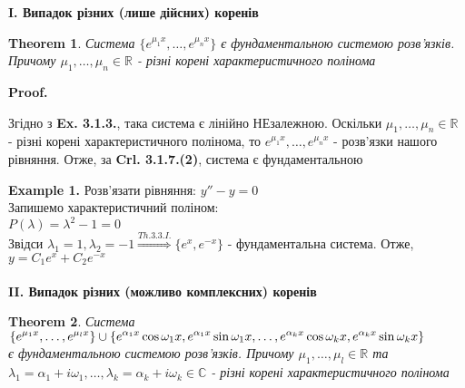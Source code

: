 \documentclass[a4paper, 10pt]{article}
\makeatletter
\def\qed{$\blacksquare$}
\theoremstyle{theoremdd}
\newtheorem{theorem}{Theorem}[subsection]
\theoremstyle{theoremdd}
\theoremstyle{theoremdd}
\theoremstyle{theoremdd}
\theoremstyle{theoremdd}
\theoremstyle{theoremdd}
\theoremstyle{theoremdd}
\theoremstyle{theoremdd}
\renewenvironment{proof}[1][Proof.\\]{\par
\pushQED{\hfill \qed}%
\normalfont \topsep6\p@\@plus6\p@\relax
\trivlist
\item\relax
{\bfseries
#1\@addpunct{.}}\hspace\labelsep\ignorespaces
}{%
\popQED\endtrivlist\@endpefalse
}
\makeatother
\begin{document}
\textbf{I. Випадок різних (лише дійсних) коренів}
\begin{theorem}
 Система $\displaystyle \{e^{\mu_1 x}, \dots, e^{\mu_n x}\}$ є фундаментальною системою розв'язків. Причому $\mu_1, \dots, \mu_n \in \mathbb{R}$ - різні корені характеристичного полінома
\end{theorem}

\begin{proof}
Згідно з \textbf{Ex. 3.1.3.}, така система є лінійно НЕзалежною. Оскільки $\mu_1, \dots, \mu_n \in \mathbb{R}$ - різні корені характеристичного полінома, то $e^{\mu_1 x}, \dots, e^{\mu_n x}$ - розв'язки нашого рівняння. Отже, за \textbf{Crl. 3.1.7.(2)}, система є фундаментальною 
\end{proof}

\textbf{Example 1.} Розв'язати рівняння: $y'' - y = 0$\\
Запишемо характеристичний поліном:\\
$P(\lambda) = \lambda^2 - 1 = 0$\\
Звідси $\lambda_1 = 1, \lambda_2 = -1 \overset{Th. 3.3.I.}{\Rightarrow} \{e^x, e^{-x}\}$ - фундаментальна система.
Отже, $y = C_1e^x + C_2e^{-x}$
\\
\bigskip \\
\textbf{II. Випадок різних (можливо комплексних) коренів}
\begin{theorem}
 Система $\\ \displaystyle \{e^{\mu_1 x}, \dots, e^{\mu_l x}\} \cup \{e^{\alpha_1 x} \cos \omega_1 x, e^{\alpha_1 x} \sin \omega_1 x, \dots, e^{\alpha_k x} \cos \omega_k x, e^{\alpha_k x} \sin \omega_k x\}$ \\ є фундаментальною системою розв'язків. Причому $\mu_1, \dots, \mu_l \in \mathbb{R}$ та $\lambda_1 = \alpha_1 + i\omega_1, \dots, \lambda_k = \alpha_k + i\omega_k \in \mathbb{C}$ - різні корені характеристичного полінома
\end{theorem}
\end{document}

